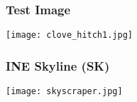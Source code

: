 \begin{frame}\frametitle{Test Image} 
\texttt{[image: clove\_hitch1.jpg]}
\end{frame}

\begin{frame} \frametitle{INE Skyline (SK)} 
  \texttt{[image: skyscraper.jpg]}
\end{frame}
